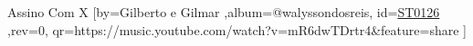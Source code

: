 \beginsong
{Assino Com X %
}[by={Gilberto e Gilmar %
},album={@walyssondosreis},
id={\href{https://music.youtube.com/watch?v=mR6dwTDrtr4&feature=share %
}{ST0126 %
}},rev={0}, %
qr={https://music.youtube.com/watch?v=mR6dwTDrtr4&feature=share %
}]
\beginverse
